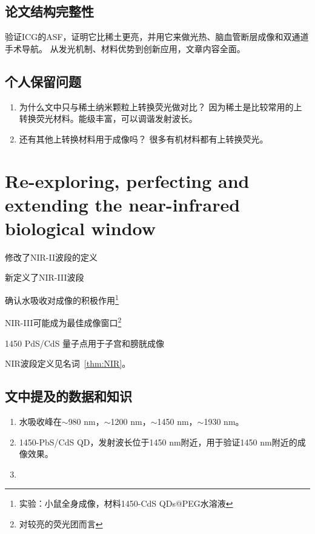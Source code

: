 \documentclass[cn,11pt,chinese]{elegantbook}
\begin{document}
\subsection{论文结构完整性}
验证ICG的ASF，证明它比稀土更亮，并用它来做光热、脑血管断层成像和双通道手术导航。
从发光机制、材料优势到创新应用，文章内容全面。

\subsection{个人保留问题}

\begin{enumerate}
  \item 为什么文中只与稀土纳米颗粒上转换荧光做对比？
  因为稀土是比较常用的上转换荧光材料。能级丰富，可以调谐发射波长。
  \item 还有其他上转换材料用于成像吗？
很多有机材料都有上转换荧光。
\end{enumerate}

\section{Re-exploring, perfecting and extending the near-infrared biological window}
\begin{introduction}[创新点概要]
  \item 修改了NIR-II波段的定义
  \item 新定义了NIR-III波段
  \item 确认水吸收对成像的积极作用\footnote{实验：小鼠全身成像，材料1450-CdS QDs@PEG水溶液}
  \item NIR-III可能成为最佳成像窗口\footnote{对较亮的荧光团而言}
  \item 1450 PdS/CdS 量子点用于子宫和膀胱成像
\end{introduction}
\begin{note}
  NIR波段定义见名词~\vref{thm:NIR}。
\end{note}
\subsection{文中提及的数据和知识}
\begin{enumerate}
  \item 水吸收峰在$\sim$980 nm，$\sim$1200 nm，$\sim$1450 nm，$\sim$1930 nm。
  \item 1450-PbS/CdS QD，发射波长位于1450 nm附近，用于验证1450 nm附近的成像效果。
  \item 
\end{enumerate}
\end{document}
